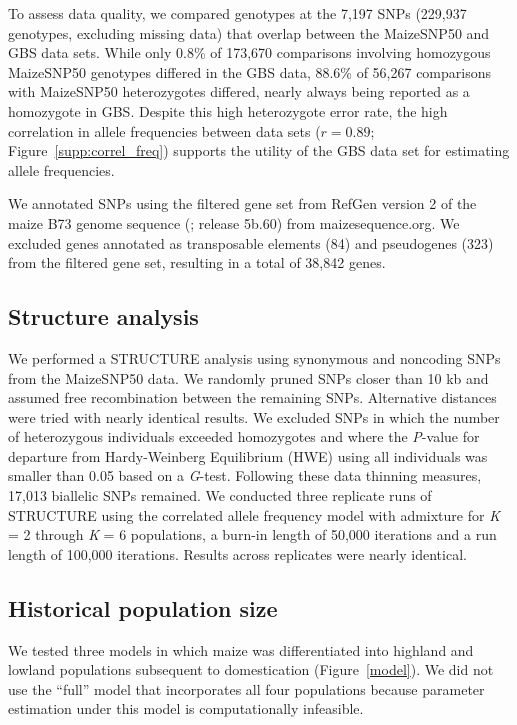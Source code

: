 To assess data quality, we compared genotypes at the 7,197 SNPs (229,937 genotypes, excluding missing data) that overlap between the MaizeSNP50 and GBS data sets. 
While only 0.8\% of 173,670  comparisons involving homozygous MaizeSNP50 genotypes differed in the GBS data, 88.6\% of 56,267 comparisons with MaizeSNP50 heterozygotes differed, nearly always being reported as a homozygote in GBS.
Despite this high heterozygote error rate,  the high correlation in allele frequencies between data sets ($r=0.89$; Figure~\ref{supp:correl_freq}) supports the utility of the GBS data set for estimating allele frequencies.  

We annotated SNPs using the filtered gene set from RefGen version 2 of the maize B73 genome sequence (\citealt{Schnable_2009_19965430}; release 5b.60) from maizesequence.org.  
We excluded genes annotated as transposable elements (84) and pseudogenes (323) from the filtered gene set, resulting in a total of 38,842 genes.

\subsection*{Structure analysis}
We performed a {\sf STRUCTURE} analysis \cite[]{Pritchard_2000_10835412,Falush_2003_12930761} using synonymous and noncoding SNPs from the MaizeSNP50 data. 
We randomly pruned SNPs closer than 10 kb and assumed free recombination between the remaining SNPs.
Alternative distances were tried with nearly identical results. 
We excluded SNPs in which the number of heterozygous individuals exceeded homozygotes and where the \emph{P}-value for departure from Hardy-Weinberg Equilibrium (HWE) using all individuals was smaller than 0.05 based on a \emph{G}-test. 
Following these data thinning measures, 17,013 biallelic SNPs remained. 
We conducted three replicate runs of {\sf STRUCTURE} using the correlated allele frequency model with admixture for \emph{K} = 2 through \emph{K} = 6 populations, a burn-in length of 50,000 iterations and a run length of 100,000 iterations. 
Results across replicates were nearly identical.

\subsection*{Historical population size}
We tested three models in which maize was differentiated into highland and lowland populations subsequent to domestication (Figure~\ref{model}). We did not use the ``full'' model that incorporates all four populations because parameter estimation under this model is computationally infeasible.


